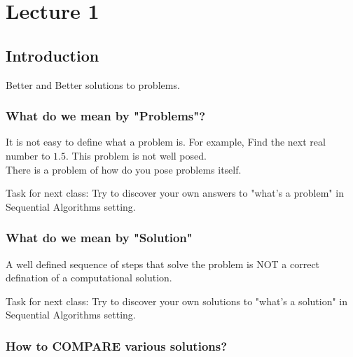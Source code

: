 \chapter{Lecture 1}

\section{Introduction}

Better and Better solutions to problems.

\subsection{What do we mean by "Problems"?}

It is not easy to define what a problem is. For example, Find the 
next real number to $1.5$. This problem is not well posed.\\

There is a problem of how do you pose problems itself.

Task for next class: Try to discover your own answers to
"what's a problem" in Sequential Algorithms setting.

\subsection{What do we mean by "Solution"}

A well defined sequence of steps that solve the problem is NOT a
correct defination of a computational solution.

Task for next class: Try to discover your own solutions to "what's
a solution" in Sequential Algorithms setting.

\subsection{How to COMPARE various solutions?}
